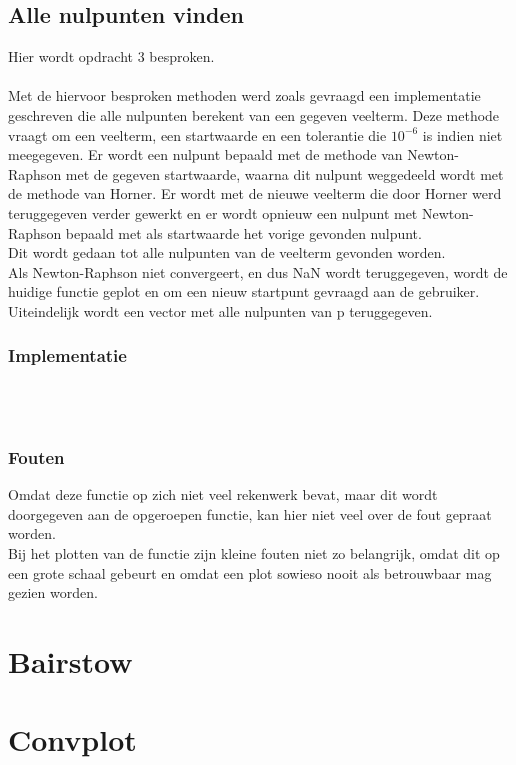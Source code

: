 \documentclass[a4paper,kulak]{kulakarticle}
\begin{document}
\subsection{Alle nulpunten vinden}
Hier wordt opdracht 3 besproken.\\~\\
Met de hiervoor besproken methoden werd zoals gevraagd een implementatie geschreven die alle nulpunten berekent van een gegeven veelterm. Deze methode vraagt om een veelterm, een startwaarde en een tolerantie die $10^{-6}$ is indien niet meegegeven. Er wordt een nulpunt bepaald met de methode van Newton-Raphson met de gegeven startwaarde, waarna dit nulpunt weggedeeld wordt met de methode van Horner. Er wordt met de nieuwe veelterm die door Horner werd teruggegeven verder gewerkt en er wordt opnieuw een nulpunt met Newton-Raphson bepaald met als startwaarde het vorige gevonden nulpunt.
\\
Dit wordt gedaan tot alle nulpunten van de veelterm gevonden worden.
\\
Als Newton-Raphson niet convergeert, en dus NaN wordt teruggegeven, wordt de huidige functie geplot en om een nieuw startpunt gevraagd aan de gebruiker.\\
Uiteindelijk wordt een vector met alle nulpunten van p teruggegeven.

\subsubsection{Implementatie}

~\\~\\

\subsubsection{Fouten}
Omdat deze functie op zich niet veel rekenwerk bevat, maar dit wordt doorgegeven aan de opgeroepen functie, kan hier niet veel over de fout gepraat worden.
\\
Bij het plotten van de functie zijn kleine fouten niet zo belangrijk, omdat dit op een grote schaal gebeurt en omdat een plot sowieso nooit als betrouwbaar mag gezien worden.

\section{Bairstow}

\section{Convplot}
\end{document}
